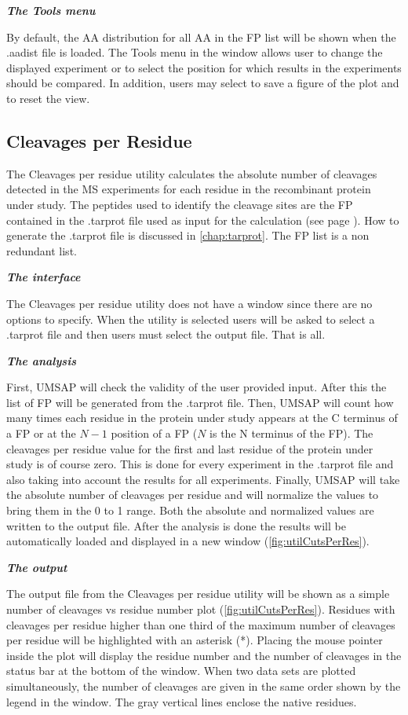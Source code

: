 \textit{\textbf{The Tools menu}}

By default, the AA distribution for all AA in the FP list will be shown when the .aadist file is loaded. The Tools menu in the window allows user to change the displayed experiment or to select the position for which results in the experiments should be compared. In addition, users may select to save a figure of the plot and to reset the view. 

\subsection{Cleavages per Residue}
\label{subsec:utilCutsPerRes}
The Cleavages per residue utility calculates the absolute number of cleavages detected in the MS experiments for each residue in the recombinant protein under study. The peptides used to identify the cleavage sites are the FP contained in the .tarprot file used as input for the calculation (see page \pageref{par:tarprotPIP}). How to generate the .tarprot file is discussed in \autoref{chap:tarprot}. The FP list is a non redundant list.

\textit{\textbf{The interface}}

The Cleavages per residue utility does not have a window since there are no options to specify. When the utility is selected users will be asked to select a .tarprot file and then users must select the output file. That is all.

\textit{\textbf{The analysis}}

First, UMSAP will check the validity of the user provided input. After this the list of FP will be generated from the .tarprot file. Then, UMSAP will count how many times each residue in the protein under study appears at the C terminus of a FP or at the \(N-1\) position of a FP (\(N\) is the N terminus of the FP). The cleavages per residue value for the first and last residue of the protein under study is of course zero. This is done for every experiment in the .tarprot file and also taking into account the results for all experiments. Finally, UMSAP will take the absolute number of cleavages per residue and will normalize the values to bring them in the 0 to 1 range. Both the absolute and normalized values are written to the output file. After the analysis is done the results will be automatically loaded and displayed in a new window (\autoref{fig:utilCutsPerRes}). 

\textit{\textbf{The output}}

The output file from the Cleavages per residue utility will be shown as a simple number of cleavages vs residue number plot (\autoref{fig:utilCutsPerRes}). Residues with cleavages per residue higher than one third of the maximum number of cleavages per residue will be highlighted with an asterisk (*). Placing the mouse pointer inside the plot will display the residue number and the number of cleavages in the status bar at the bottom of the window. When two data sets are plotted simultaneously, the number of cleavages are given in the same order shown by the legend in the window. The gray vertical lines enclose the native residues. 

